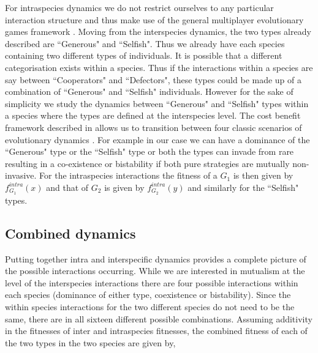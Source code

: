 \documentclass[12pt]{article}
\begin{document}
For intraspecies dynamics we do not restrict ourselves to any particular interaction structure and thus make use of the general multiplayer evolutionary games framework \citep{gokhale:PNAS:2010,gokhale:DGAA:2014}.
Moving from the interspecies dynamics, the two types already described are ``Generous" and ``Selfish".
Thus we already have each species containing two different types of individuals.
It is possible that a different categorisation exists within a species.
Thus if the interactions within a species are say between ``Cooperators" and ``Defectors", these types could be made up of a combination of ``Generous" and ``Selfish" individuals.
However for the sake of simplicity we study the dynamics between ``Generous" and ``Selfish" types within a species where the types are defined at the interspecies level.
The cost benefit framework described in \citep{eshel:AmNat:1988,hauert:JTB:2006a}
 allows us to transition between four classic scenarios of evolutionary dynamics \citep{nowak:Science:2004}.
For example in our case we can have a dominance of the ``Generous" type or the ``Selfish" type or both the types can invade from rare resulting in a co-existence or bistability if both pure strategies are mutually non-invasive.
For the intraspecies interactions the fitness of a $G_1$ is then given by $f^{intra}_{G_1} (x)$ and that of $G_2$ is given by $f^{intra}_{G_2} (y)$ and similarly for the ``Selfish" types.

\subsection{Combined dynamics}

Putting together intra and interspecific dynamics provides a complete picture of the possible interactions occurring. While we are interested in mutualism at the level of the interspecies interactions there are four possible interactions within each species \citep{nowak:Science:2004,hauert:JTB:2006a} (dominance of either type, coexistence or bistability). Since the within species interactions for the two different species do not need to be the same, there are in all sixteen different possible combinations.
Assuming additivity in the fitnesses of inter and intraspecies fitnesses, the combined fitness of each of the two types in the two species are given by,
\end{document}
